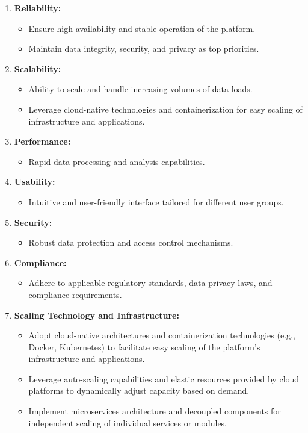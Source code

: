 \begin{enumerate}
  \item \textbf{Reliability:}
  \begin{itemize}
      \item Ensure high availability and stable operation of the platform.
      \item Maintain data integrity, security, and privacy as top priorities.
  \end{itemize}
  
  \item \textbf{Scalability:}
  \begin{itemize}
      \item Ability to scale and handle increasing volumes of data loads.
      \item Leverage cloud-native technologies and containerization for easy
      scaling of infrastructure and applications.
  \end{itemize}
  
  \item \textbf{Performance:}
  \begin{itemize}
      \item Rapid data processing and analysis capabilities.
  \end{itemize}
  
  \item \textbf{Usability:}
  \begin{itemize}
      \item Intuitive and user-friendly interface tailored for different user
      groups.
  \end{itemize}
  
  \item \textbf{Security:}
  \begin{itemize}
      \item Robust data protection and access control mechanisms.
  \end{itemize}
  
  \item \textbf{Compliance:}
  \begin{itemize}
      \item Adhere to applicable regulatory standards, data privacy laws, and
      compliance requirements.
  \end{itemize}
  
  \item \textbf{Scaling Technology and Infrastructure:}
  \begin{itemize}
      \item Adopt cloud-native architectures and containerization technologies
      (e.g., Docker, Kubernetes) to facilitate easy scaling of the platform's
      infrastructure and applications.
      \item Leverage auto-scaling capabilities and elastic resources provided by
      cloud platforms to dynamically adjust capacity based on demand.
      \item Implement microservices architecture and decoupled components for
      independent scaling of individual services or modules.
  \end{itemize}
\end{enumerate}

